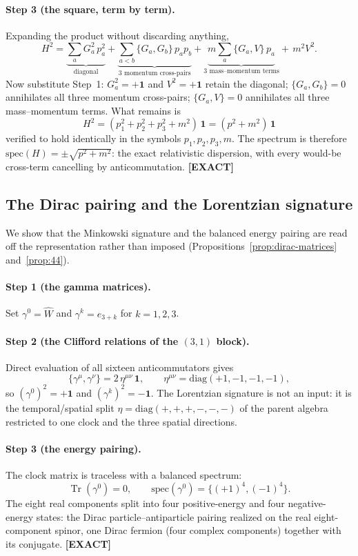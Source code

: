 \documentclass[11pt,oneside]{book}
\newcommand{\Wh}{\hat{W}}                         %
\newcommand{\Tr}{\operatorname{Tr}}
\newcommand{\status}[1]{{\sffamily\bfseries\color{statuscol}[#1]}}
\theoremstyle{plain}
\theoremstyle{definition}
\theoremstyle{remark}
\begin{document}
\paragraph{Step 3 (the square, term by term).}
Expanding the product without discarding anything,
\[
  H^2=\underbrace{\sum_{a}G_a^2\,p_a^2}_{\text{diagonal}}
     +\underbrace{\sum_{a<b}\{G_a,G_b\}\,p_ap_b}_{\text{3 momentum cross-pairs}}
     +\underbrace{m\sum_{a}\{G_a,V\}\,p_a}_{\text{3 mass--momentum terms}}
     +\,m^2V^2 .
\]
Now substitute Step~1: $G_a^2=+\mathbf 1$ and $V^2=+\mathbf 1$ retain the diagonal;
$\{G_a,G_b\}=0$ annihilates all three momentum cross-pairs; $\{G_a,V\}=0$ annihilates
all three mass--momentum terms. What remains is
\[
  \boxed{\;H^2=(p_1^2+p_2^2+p_3^2+m^2)\,\mathbf 1=(p^2+m^2)\,\mathbf 1\;}
\]
verified to hold identically in the symbols $p_1,p_2,p_3,m$. The spectrum is therefore
$\mathrm{spec}(H)=\pm\sqrt{p^2+m^2}$: the exact relativistic dispersion, with every
would-be cross-term cancelling by anticommutation. \status{EXACT}

\subsection{The Dirac pairing and the Lorentzian signature}
\label{wd:dirac}
We show that the Minkowski signature and the balanced energy pairing are read off the
representation rather than imposed (Propositions~\ref{prop:dirac-matrices}
and~\ref{prop:44}).

\paragraph{Step 1 (the gamma matrices).}
Set $\gamma^0=\Wh$ and $\gamma^k=e_{3+k}$ for $k=1,2,3$.

\paragraph{Step 2 (the Clifford relations of the $(3,1)$ block).}
Direct evaluation of all sixteen anticommutators gives
\[
  \{\gamma^\mu,\gamma^\nu\}=2\,\eta^{\mu\nu}\,\mathbf 1,\qquad
  \eta^{\mu\nu}=\mathrm{diag}(+1,-1,-1,-1),
\]
so $(\gamma^0)^2=+\mathbf 1$ and $(\gamma^k)^2=-\mathbf 1$. The Lorentzian signature is
not an input: it is the temporal/spatial split $\eta=\mathrm{diag}(+,+,+,-,-,-)$ of
the parent algebra restricted to one clock and the three spatial directions.

\paragraph{Step 3 (the energy pairing).}
The clock matrix is traceless with a balanced spectrum:
\[
  \Tr(\gamma^0)=0,\qquad
  \mathrm{spec}(\gamma^0)=\{(+1)^4,(-1)^4\}.
\]
The eight real components split into four positive-energy and four negative-energy
states: the Dirac particle--antiparticle pairing realized on the real eight-component
spinor, one Dirac fermion (four complex components) together with its conjugate.
\status{EXACT}
\end{document}
